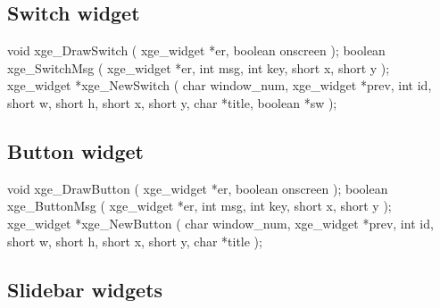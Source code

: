 \subsection{Switch widget}

\begin{listingC}
void xge_DrawSwitch ( xge_widget *er, boolean onscreen );
boolean xge_SwitchMsg ( xge_widget *er,
                        int msg, int key, short x, short y );
xge_widget *xge_NewSwitch ( char window_num, xge_widget *prev,
                            int id,
                            short w, short h, short x, short y,
                            char *title, boolean *sw );
\end{listingC}


\subsection{Button widget}

\begin{listingC}
void xge_DrawButton ( xge_widget *er, boolean onscreen );
boolean xge_ButtonMsg ( xge_widget *er,
                        int msg, int key, short x, short y );
xge_widget *xge_NewButton ( char window_num, xge_widget *prev,
                            int id,
                            short w, short h, short x, short y,
                            char *title );
\end{listingC}


\subsection{Slidebar widgets}

